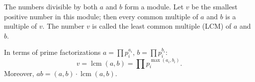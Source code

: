 The numbers divisible by both $a$ and $b$ form a module. Let $v$ be the smallest positive number in this module; then every common multiple of $a$ and $b$ is a multiple of $v$. The number $v$ is called the least common multiple (LCM) of $a$ and $b$.

In terms of prime factorizations $a = \prod p_i^{a_i}$, $b = \prod p_i^{b_i}$:
$$v = \operatorname{lcm}(a, b) = \prod p_i^{\max(a_i, b_i)}.$$
Moreover, $ab = (a, b) \cdot \operatorname{lcm}(a, b)$.
